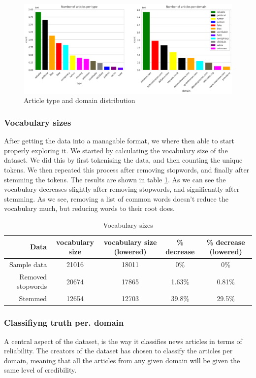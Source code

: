 \begin{figure}[htpb]
  \centering
  \includegraphics[width=1\textwidth]{combdist}
  \caption{Article type and domain distribution}
  \label{fig:combdist}
\end{figure}
\subsubsection{Vocabulary sizes}
After getting the data into a managable format, we where then able to start properly exploring it. We started by
calculating the vocabulary size of the dataset. We did this by first tokenising the data, and then counting the
unique tokens. We then repeated this process after removing stopwords, and finally after stemming the tokens. The
results are shown in table \ref{tab:vocab_sizes}. As we can see the vocabulary decreases slightly after removing
stopwords, and significantly after stemming. As we see, removing a list of common words doesn't reduce the vocabulary
much, but reducing words to their root does.

\begin{table}[h]
    \centering
    \begin{tabular}{r| c | c | c| c}
      Data& vocabulary size & vocabulary size (lowered) & \% decrease & \% decrease (lowered)\\
        \hline
      Sample data& 21016 & 18011 & 0\% & 0\% \\
    \hline
      Removed stopwords & 20674 & 17865 & 1.63\% & 0.81\% \\
    \hline
      Stemmed & 12654 & 12703 & 39.8\% & 29.5\%
    \end{tabular}
    \caption{Vocabulary sizes}
    \label{tab:vocab_sizes}
\end{table}



\subsubsection{Classifiyng truth per. domain}\label{sec:truth_pr_domain}
A central aspect of the dataset, is the way it classifies news articles in terms of reliability. The creators of the
dataset has chosen to classify the articles per domain, meaning that all the articles from any given domain will be
given the same level of credibility.

